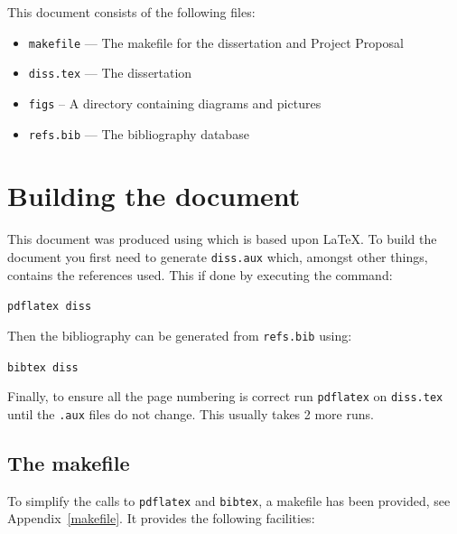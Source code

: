\documentclass[12pt,a4paper,twoside,openright]{report}
\begin{document}
This document consists of the following files:

\begin{itemize}
\item \texttt{makefile} --- The makefile for the dissertation and
                         Project Proposal
\item \texttt{diss.tex} --- The dissertation
\item \texttt{figs} -- A directory containing diagrams and pictures
\item \texttt{refs.bib} --- The bibliography database
\end{itemize}

\section{Building the document}

This document was produced using \LaTeXe which is based upon
\LaTeX\cite{Lamport86}.  To build the document you first need to
generate \texttt{diss.aux} which, amongst other things, contains the
references used.  This if done by executing the command:

\texttt{pdflatex diss}

\noindent
Then the bibliography can be generated from \texttt{refs.bib} using:

\texttt{bibtex diss}

\noindent
Finally, to ensure all the page numbering is correct run \texttt{pdflatex}
on \texttt{diss.tex} until the \texttt{.aux} files do not change.  This
usually takes 2 more runs.

\subsection{The makefile}

To simplify the calls to \texttt{pdflatex} and \texttt{bibtex}, 
a makefile has been provided, see Appendix~\ref{makefile}. 
It provides the following facilities:
\end{document}
